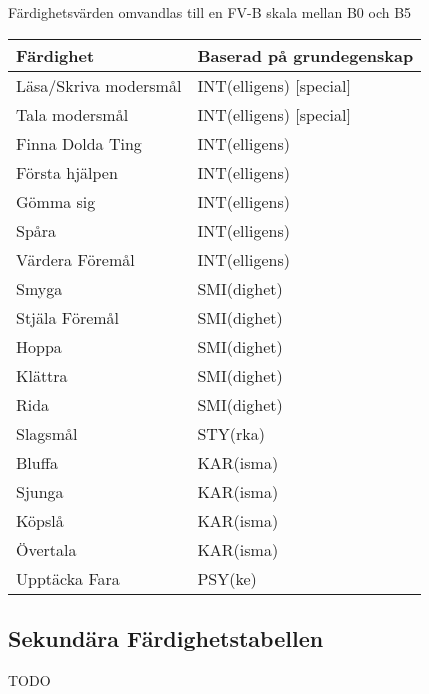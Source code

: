 \documentclass[a4paper, 10pt, titlepage]{article}
\begin{document}
Färdighetsvärden omvandlas till en FV-B skala mellan B0 och B5

\begin{table}[hbp]
  \begin{tabular}{|l|l|}
    \hline
    Färdighet         & Baserad på grundegenskap \\
    \hline
    Läsa/Skriva modersmål & INT(elligens) [special] \\
    Tala modersmål        & INT(elligens) [special] \\
    Finna Dolda Ting  & INT(elligens) \\
    Första hjälpen    & INT(elligens) \\
    Gömma sig         & INT(elligens) \\
    Spåra             & INT(elligens) \\
    Värdera Föremål   & INT(elligens) \\
    Smyga             & SMI(dighet) \\
    Stjäla Föremål    & SMI(dighet) \\
    Hoppa             & SMI(dighet)   \\
    Klättra           & SMI(dighet)   \\
    Rida              & SMI(dighet) \\
    Slagsmål          & STY(rka) \\
    Bluffa            & KAR(isma) \\
    Sjunga            & KAR(isma) \\
    Köpslå            & KAR(isma)  \\
    Övertala          & KAR(isma) \\
    Upptäcka Fara     & PSY(ke) \\
  \end{tabular}
\end{table}

\subsection{Sekundära Färdighetstabellen}

TODO
\end{document}
